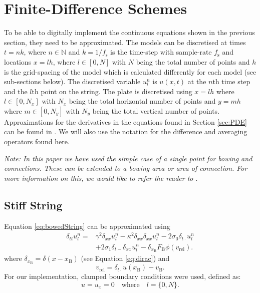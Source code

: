 \documentclass{article}
\begin{document}
\section{Finite-Difference Schemes}\label{sec:FDS}
To be able to digitally implement the continuous equations shown in the previous section, they need to be approximated. The models can be discretised at times $t = nk$, where $n \in \mathbb{N}$ and $k = 1 / f_\text{s}$ is the time-step with sample-rate $f_\text{s}$ and locations $x = lh$, where $l \in [0,N]$ with $N$ being the total number of points and $h$ is the grid-spacing of the model which is calculated differently for each model (see sub-sections below). The discretised variable $u_l^n$ is $u(x,t)$ at the $n$th time step and the $l$th point on the string. The plate is discretised using $x = lh$ where $l \in [0,N_x]$ with $N_x$ being the total horizontal number of points and $y = mh$ where $m \in [0,N_y]$ with $N_y$ being the total vertical number of points. 
Approximations for the derivatives in the equations found in Section \ref{sec:PDE} can be found in \cite{Bilbao2009:NumericalSoundSynthesis}. We will also use the notation for the difference and averaging operators found here. 

\textit{Note: In this paper we have used the simple case of a single point for bowing and connections. These can be extended to a bowing area or area of connection. For more information on this, we would like to refer the reader to \cite{Bilbao2009:ModularPercussion}}.

\subsection{Stiff String}\label{subsec:stiffStringFDS}
Equation \eqref{eq:bowedString} can be approximated using
\begin{equation}
\begin{aligned}\label{eq:bowedStringFDS}
\delta_{tt} u_l^n = &\gamma^2 \delta_{xx} u_l^n -\kappa^2\delta_{xx}\delta_{xx} u_l^n - 2\sigma_0\delta_{t\cdot} u_l^n  \\
&+ 2\sigma_1\delta_{t-}\delta_{xx}u_l^n - \delta_{x_\text{B}}F_\text{B}\phi(v_\text{rel}).
\end{aligned}
\end{equation}
where $\delta_{x_\text{B}} = \delta(x-x_\text{B})$ (see Equation \eqref{eq:dirac}) and 
\begin{equation}\label{eq:descreteRelativeVel}
    v_\text{rel} = \delta_{t\cdot}u(x_\text{B})-v_\text{B}.
\end{equation}
For our implementation, clamped boundary conditions were used, defined as:
\begin{equation}\label{boundary}
    u = u_x = 0 \quad \text{where} \quad l = \{0, N\}.
\end{equation}
  
\end{document}
